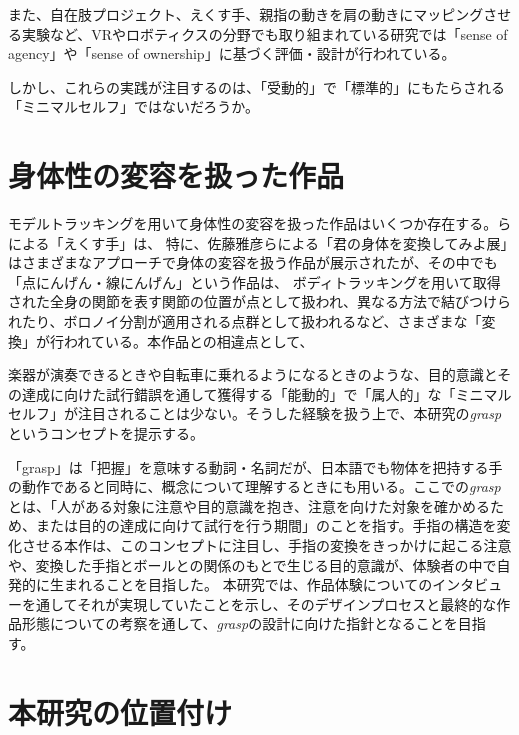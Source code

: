 また、自在肢プロジェクト、えくす手、親指の動きを肩の動きにマッピングさせる実験など、VRやロボティクスの分野でも取り組まれている研究では「sense of agency」や「sense of ownership」に基づく評価・設計が行われている。

しかし、これらの実践が注目するのは、「受動的」で「標準的」にもたらされる「ミニマルセルフ」ではないだろうか。

\section{身体性の変容を扱った作品}
モデルトラッキングを用いて身体性の変容を扱った作品はいくつか存在する。らによる「えくす手」\cite{ekusute}は、
特に、佐藤雅彦らによる「君の身体を変換してみよ展」はさまざまなアプローチで身体の変容を扱う作品が展示されたが、その中でも「点にんげん・線にんげん」という作品は、
ボディトラッキングを用いて取得された全身の関節を表す関節の位置が点として扱われ、異なる方法で結びつけられたり、ボロノイ分割が適用される点群として扱われるなど、さまざまな「変換」が行われている。本作品との相違点として、


楽器が演奏できるときや自転車に乗れるようになるときのような、目的意識とその達成に向けた試行錯誤を通して獲得する「能動的」で「属人的」な「ミニマルセルフ」が注目されることは少ない。そうした経験を扱う上で、本研究の\textit{grasp}というコンセプトを提示する。

「grasp」は「把握」を意味する動詞・名詞だが、日本語でも物体を把持する手の動作であると同時に、概念について理解するときにも用いる。ここでの\textit{grasp}とは、「人がある対象に注意や目的意識を抱き、注意を向けた対象を確かめるため、または目的の達成に向けて試行を行う期間」のことを指す。手指の構造を変化させる本作は、このコンセプトに注目し、手指の変換をきっかけに起こる注意や、変換した手指とボールとの関係のもとで生じる目的意識が、体験者の中で自発的に生まれることを目指した。
本研究では、作品体験についてのインタビューを通してそれが実現していたことを示し、そのデザインプロセスと最終的な作品形態についての考察を通して、\textit{grasp}の設計に向けた指針となることを目指す。

\section{本研究の位置付け}
